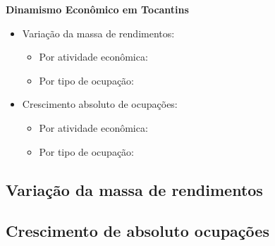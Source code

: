 \documentclass[8pt]{beamer}
\begin{document}
\begin{frame}[label=indice_principal_amz_to]{}

\textit{\hyperlink{indice_principal}{}}

\textbf{Dinamismo Econômico em Tocantins}
\vspace{2mm}

\begin{itemize}

\item{Variação da massa de rendimentos:
	\begin{itemize}
	\item{Por atividade econômica: \hyperlink{amztorkngvmassaporcnae2dig}{}}
	\item{Por tipo de ocupação: \hyperlink{amztorkngvmassaporcod2dig}{}}
	\end{itemize}
}
\vspace{1mm}

\item{Crescimento  absoluto de ocupações:
	\begin{itemize}
	\item{Por atividade econômica: \hyperlink{amztorkngnocuporcnae2dig}{}}
	\item{Por tipo de ocupação: \hyperlink{amztorkngnocuporcod2dig}{}}
	\end{itemize}
}
\vspace{1mm}

\end{itemize}

\end{frame}


\subsection{Variação da massa de rendimentos}

\begin{frame}
\textit{\hyperlink{indice_principal_amz_to}{}}

\end{frame}

\begin{frame}
\textit{\hyperlink{indice_principal_amz_to}{}}

\end{frame}

\subsection{Crescimento de absoluto ocupações}
\end{document}
